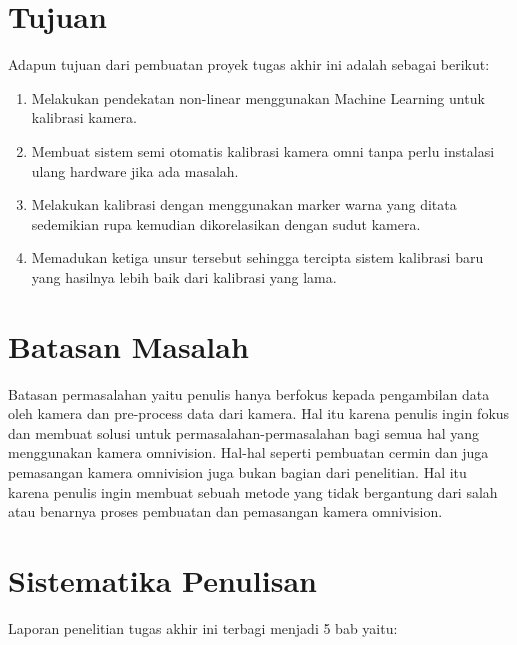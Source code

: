 \section{Tujuan}
\label{sec:Tujuan}

Adapun tujuan dari pembuatan proyek tugas akhir ini adalah sebagai berikut: 
\begin{enumerate}[nolistsep]
    \item Melakukan pendekatan non-linear menggunakan Machine Learning untuk kalibrasi kamera. 
    \item Membuat sistem semi otomatis kalibrasi kamera omni tanpa perlu instalasi ulang hardware jika ada masalah. 
    \item Melakukan kalibrasi dengan menggunakan marker warna yang ditata sedemikian rupa kemudian dikorelasikan dengan sudut kamera. 
    \item Memadukan ketiga unsur tersebut sehingga tercipta sistem kalibrasi baru yang hasilnya lebih baik dari kalibrasi yang lama. 
\end{enumerate}


\section{Batasan Masalah}
\label{sec:batasanmasalah}

Batasan permasalahan yaitu penulis hanya berfokus kepada pengambilan data oleh kamera dan pre-process data dari kamera. Hal itu karena penulis ingin fokus dan membuat solusi untuk permasalahan-permasalahan bagi semua hal yang menggunakan kamera omnivision. Hal-hal seperti pembuatan cermin dan juga pemasangan kamera omnivision juga bukan bagian dari penelitian. Hal itu karena penulis ingin membuat sebuah metode yang tidak bergantung dari salah atau benarnya proses pembuatan dan pemasangan kamera omnivision.

\section{Sistematika Penulisan}
\label{sec:sistematikapenulisan}

Laporan penelitian tugas akhir ini terbagi menjadi 5 bab yaitu:

